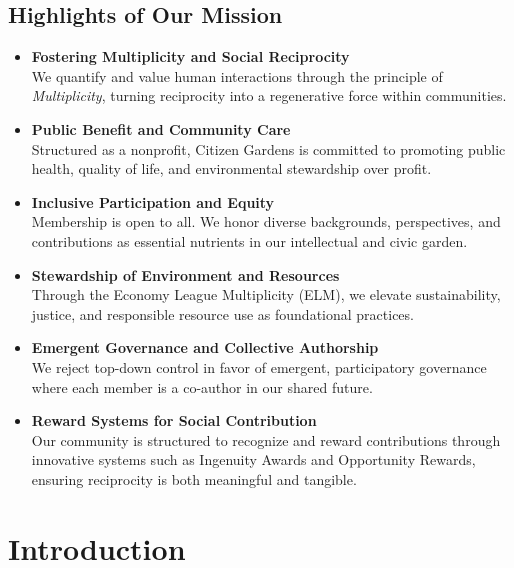 \documentclass[12pt]{article}
\begin{document}
\subsection*{Highlights of Our Mission}

\begin{itemize}
    \item \textbf{Fostering Multiplicity and Social Reciprocity} \\
    We quantify and value human interactions through the principle of \textit{Multiplicity}, turning reciprocity into a regenerative force within communities.

    \item \textbf{Public Benefit and Community Care} \\
    Structured as a nonprofit, Citizen Gardens is committed to promoting public health, quality of life, and environmental stewardship over profit.

    \item \textbf{Inclusive Participation and Equity} \\
    Membership is open to all. We honor diverse backgrounds, perspectives, and contributions as essential nutrients in our intellectual and civic garden.

    \item \textbf{Stewardship of Environment and Resources} \\
    Through the Economy League Multiplicity (ELM), we elevate sustainability, justice, and responsible resource use as foundational practices.

    \item \textbf{Emergent Governance and Collective Authorship} \\
    We reject top-down control in favor of emergent, participatory governance where each member is a co-author in our shared future.

    \item \textbf{Reward Systems for Social Contribution} \\
    Our community is structured to recognize and reward contributions through innovative systems such as Ingenuity Awards and Opportunity Rewards, ensuring reciprocity is both meaningful and tangible.
\end{itemize}

\newpage
\section{Introduction}
\end{document}
